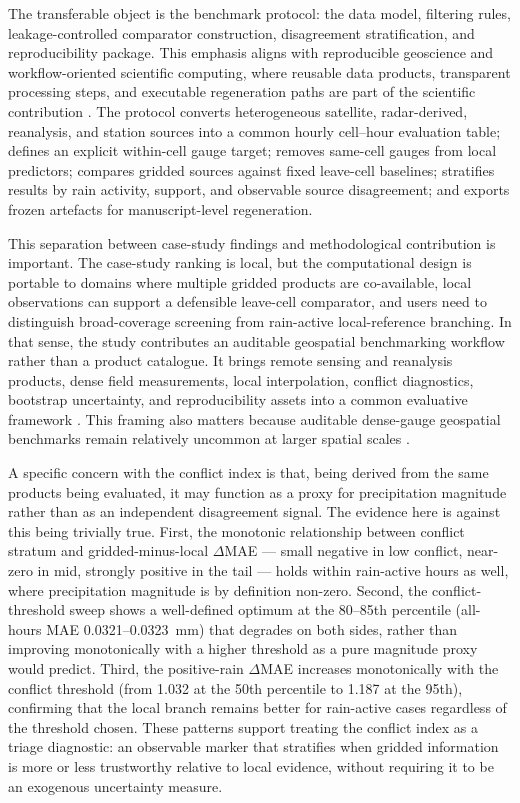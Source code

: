 \documentclass[preprint,12pt]{elsarticle}
\begin{document}
The transferable object is the benchmark protocol: the data model, filtering rules, leakage-controlled comparator construction, disagreement stratification, and reproducibility package. This emphasis aligns with reproducible geoscience and workflow-oriented scientific computing, where reusable data products, transparent processing steps, and executable regeneration paths are part of the scientific contribution \citep{pebesma2012rgeoscience,gil2016geosciencepaper,wilson2017goodenough,nuest2021practical}. The protocol converts heterogeneous satellite, radar-derived, reanalysis, and station sources into a common hourly cell--hour evaluation table; defines an explicit within-cell gauge target; removes same-cell gauges from local predictors; compares gridded sources against fixed leave-cell baselines; stratifies results by rain activity, support, and observable source disagreement; and exports frozen artefacts for manuscript-level regeneration.

This separation between case-study findings and methodological contribution is important. The case-study ranking is local, but the computational design is portable to domains where multiple gridded products are co-available, local observations can support a defensible leave-cell comparator, and users need to distinguish broad-coverage screening from rain-active local-reference branching. In that sense, the study contributes an auditable geospatial benchmarking workflow rather than a product catalogue. It brings remote sensing and reanalysis products, dense field measurements, local interpolation, conflict diagnostics, bootstrap uncertainty, and reproducibility assets into a common evaluative framework \citep{pohl1998datafusion,refsgaard2007uncertainty,bennett2013performance,kirschbaum2017applications,portier2023gpmapplications}. This framing also matters because auditable dense-gauge geospatial benchmarks remain relatively uncommon at larger spatial scales \citep{kidd2017gauges}.

A specific concern with the conflict index is that, being derived from the same products being evaluated, it may function as a proxy for precipitation magnitude rather than as an independent disagreement signal. The evidence here is against this being trivially true. First, the monotonic relationship between conflict stratum and gridded-minus-local $\Delta$MAE --- small negative in low conflict, near-zero in mid, strongly positive in the tail --- holds within rain-active hours as well, where precipitation magnitude is by definition non-zero. Second, the conflict-threshold sweep shows a well-defined optimum at the 80--85th percentile (all-hours MAE 0.0321--0.0323~mm) that degrades on both sides, rather than improving monotonically with a higher threshold as a pure magnitude proxy would predict. Third, the positive-rain $\Delta$MAE increases monotonically with the conflict threshold (from 1.032 at the 50th percentile to 1.187 at the 95th), confirming that the local branch remains better for rain-active cases regardless of the threshold chosen. These patterns support treating the conflict index as a triage diagnostic: an observable marker that stratifies when gridded information is more or less trustworthy relative to local evidence, without requiring it to be an exogenous uncertainty measure.
\end{document}
